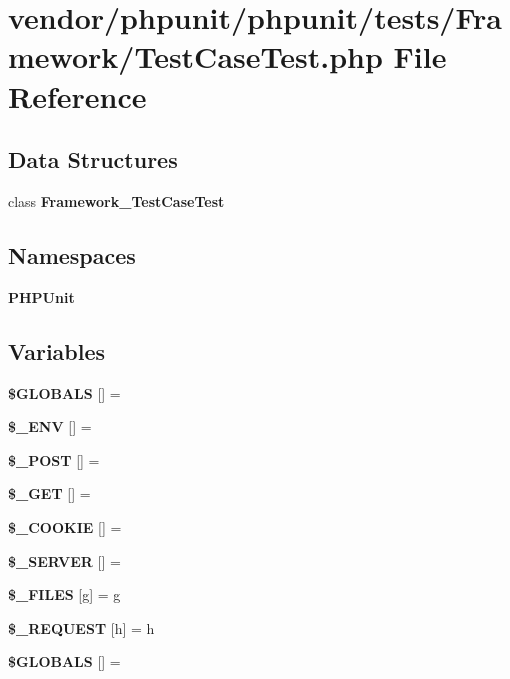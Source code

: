 \section{vendor/phpunit/phpunit/tests/\+Framework/\+Test\+Case\+Test.php File Reference}
\label{_test_case_test_8php}
\subsection*{Data Structures}
\begin{DoxyCompactItemize}
\item 
class {\bf Framework\+\_\+\+Test\+Case\+Test}
\end{DoxyCompactItemize}
\subsection*{Namespaces}
\begin{DoxyCompactItemize}
\item 
 {\bf P\+H\+P\+Unit}
\end{DoxyCompactItemize}
\subsection*{Variables}
\begin{DoxyCompactItemize}
\item 
{\bf \$\+G\+L\+O\+B\+A\+L\+S} [\textquotesingle{}] = \textquotesingle{}
\item 
{\bf \$\+\_\+\+E\+N\+V} [\textquotesingle{}] = \textquotesingle{}
\item 
{\bf \$\+\_\+\+P\+O\+S\+T} [\textquotesingle{}] = \textquotesingle{}
\item 
{\bf \$\+\_\+\+G\+E\+T} [\textquotesingle{}] = \textquotesingle{}
\item 
{\bf \$\+\_\+\+C\+O\+O\+K\+I\+E} [\textquotesingle{}] = \textquotesingle{}
\item 
{\bf \$\+\_\+\+S\+E\+R\+V\+E\+R} [\textquotesingle{}] = \textquotesingle{}
\item 
{\bf \$\+\_\+\+F\+I\+L\+E\+S} [\textquotesingle{}g\textquotesingle{}] = \textquotesingle{}g\textquotesingle{}
\item 
{\bf \$\+\_\+\+R\+E\+Q\+U\+E\+S\+T} [\textquotesingle{}h\textquotesingle{}] = \textquotesingle{}h\textquotesingle{}
\item 
{\bf \$\+G\+L\+O\+B\+A\+L\+S} [\textquotesingle{}] = \textquotesingle{}
\end{DoxyCompactItemize}


